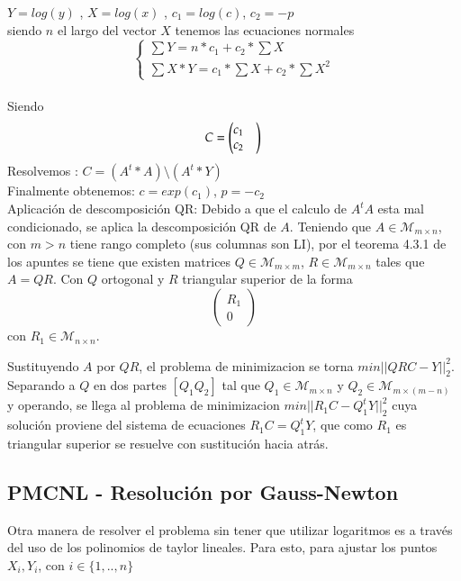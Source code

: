 \documentclass{endm}
\begin{document}
$Y =log(y)$ , $X =log(x)$ , $c_1= log(c)$, $c_2= -p$ \\
siendo $n$ el largo del vector $X$ tenemos las ecuaciones normales
\begin{equation}
\begin{cases}
\sum Y = n * c_1 + c_2 * \sum X \\
\sum X * Y = c_1 * \sum X + c_2 * \sum X^2
\end{cases}
\end{equation}  \\
Siendo \begin{equation*}C=\begin{pmatrix}
          c_1 & \\
          c_2
         \end{pmatrix} \\
\end{equation*}
Resolvemos : $ C=(A^t * A) \setminus  (A^t * Y)$ \\
Finalmente obtenemos:  $c= exp(c_1)$, $p = -c_2$ \\


Aplicación de descomposición QR:
Debido a que el calculo de $A^tA$ esta mal condicionado, se aplica la descomposición QR de $A$.
Teniendo que $A \in \mathcal{M}_{m \times n}$, con $m > n$ tiene rango completo (sus columnas son LI),
por el teorema 4.3.1 de los apuntes se tiene que existen matrices $Q \in \mathcal{M}_{m \times m}$,
$R \in \mathcal{M}_{m \times n}$ tales que $A = QR$. Con $Q$ ortogonal
y $R$ triangular superior de la forma  \begin{equation*} \begin{pmatrix} R_1 \\ 0 \end{pmatrix}\end{equation*} con $R_1 \in \mathcal{M}_{n \times n}$.

Sustituyendo $A$ por $QR$, el problema de minimizacion se torna $min ||QRC - Y||^2_2$.
Separando a $Q$ en dos partes $[Q_1 Q_2]$ tal que $Q_1 \in \mathcal{M}_{m \times n}$ y
$Q_2 \in \mathcal{M}_{m \times (m-n)}$ y operando, se llega al problema de minimizacion $min ||R_1C - Q_1^tY||^2_2$
cuya solución proviene del sistema de ecuaciones $R_1C = Q_1^tY$, que como $R_1$ es triangular superior se resuelve con
sustitución hacia atrás.


\subsection{PMCNL - Resolución por Gauss-Newton}
Otra manera de resolver el problema sin tener que utilizar logaritmos es a través del uso de los polinomios de taylor lineales. Para esto, para ajustar los puntos $X_i,Y_i$, con $ i \in \{1,..,n\}$
\end{document}
